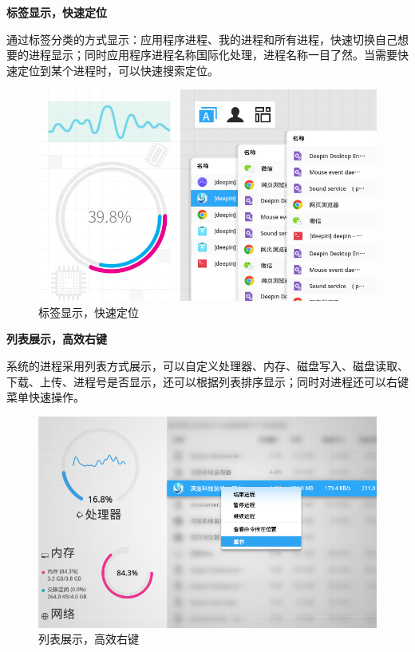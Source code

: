 \documentclass[doctor,openright,twoside]{sjtuthesis}
\theoremstyle{plain}
\theoremstyle{definition}
\theoremstyle{remark}
\theoremstyle{ocrenumbox}
\theoremstyle{plain}
\begin{document}
\textbf{标签显示，快速定位}

通过标签分类的方式显示：应用程序进程、我的进程和所有进程，快速切换自己想要的进程显示；同时应用程序进程名称国际化处理，进程名称一目了然。当需要快速定位到某个进程时，可以快速搜索定位。

\begin{figure}
\centering
\includegraphics{images/deepin-system-monitor-3.jpg}
\caption{标签显示，快速定位}
\end{figure}

\textbf{列表展示，高效右键}

系统的进程采用列表方式展示，可以自定义处理器、内存、磁盘写入、磁盘读取、下载、上传、进程号是否显示，还可以根据列表排序显示；同时对进程还可以右键菜单快速操作。

\begin{figure}
\centering
\includegraphics{images/deepin-system-monitor-4.jpg}
\caption{列表展示，高效右键}
\end{figure}
\end{document}
